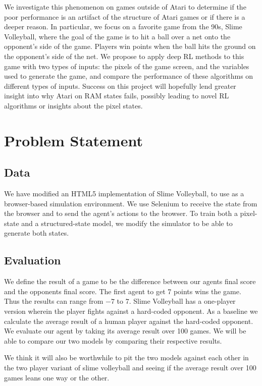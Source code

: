 \documentclass[10pt,twocolumn,letterpaper]{article}
\begin{document}
We investigate this phenomenon on games outside of Atari to determine
if the poor performance is an artifact of the structure of Atari games or if
there is a deeper reason. In particular, we focus on a favorite game from the
90s, Slime Volleyball, where the goal of the game is to hit a ball over a net
onto the opponent's side of the game. Players win points when the ball hits the
ground on the opponent's side of the net. We propose to apply deep RL methods to
this game with two types of inputs: the pixels of the game screen, and the
variables used to generate the game, and compare the performance of these
algorithms on different types of inputs. Success on this project will hopefully
lend greater insight into why Atari on RAM states fails, possibly leading to
novel RL algorithms or insights about the pixel states.

\section{Problem Statement}
\subsection{Data}

We have modified an HTML5 implementation of Slime Volleyball, to use
as a browser-based simulation environment. We use Selenium to receive the
state from the browser and to send the agent's actions to the browser. To train
both a pixel-state and a structured-state model, we modify the simulator to be
able to generate both states.

\subsection{Evaluation}

We define the result of a game to be the difference between our agents final score
and the opponents final score. The first agent to get 7 points wins the game.
Thus the results can range from $-7$ to $7$. Slime Volleyball has a one-player
version wherein the player fights against a hard-coded opponent. As a baseline
we calculate the average result of a human player against the hard-coded opponent. \\

\noindent We evaluate our agent by taking its average result over 100
games. We will be able to compare our two models by comparing their respective
results.

\noindent We think it will also be worthwhile to pit the two models against each
other in the two player variant of slime volleyball and seeing if the average
result over 100 games leans one way or the other.
\end{document}

